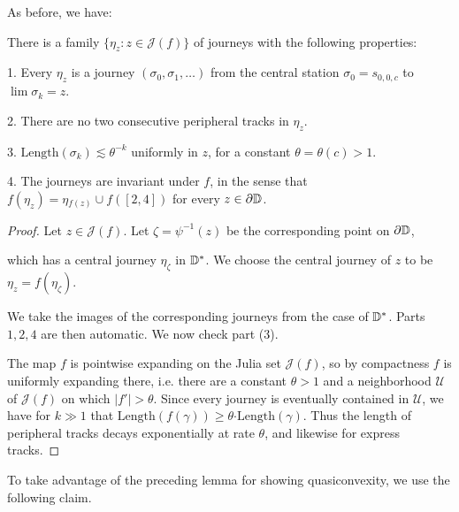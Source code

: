As before, we have:
\begin{lemma}
There is a family $\{\eta_{z}:z\in\mathcal{J}(f)\}$ of journeys
with the following properties:

1. Every $\eta_{z}$ is a journey $\left(\sigma_{0},\sigma_{1},\ldots\right)$
from the central station $\sigma_{0}=s_{0,0,c}$ to $\lim\sigma_{k}=z$.

2. There are no two consecutive peripheral tracks in $\eta_{z}$.

3. $\mathrm{Length}(\sigma_{k})\lesssim\theta^{-k}$ uniformly in
$z$, for a constant $\theta=\theta(c)>1$.

4. The journeys are invariant under $f$, in the sense that $f(\eta_{z})=\eta{}_{f(z)}\cup f\left([2,4]\right)$
for every $z\in\partial\mathbb{D}$.
\end{lemma}

\begin{proof}
Let $z\in\mathcal{J}\left(f\right)$. Let $\zeta=\psi^{-1}(z)$
be the corresponding point on $\partial\mathbb{D}$, %
\begin{comment}
because $\psi$ extends to a homeomorphism in the hyperbolic case.
\end{comment}

which has a central journey $\eta_{\zeta}$ in $\mathbb{D}^{*}$. We choose
the central journey of $z$ to be $\eta_{z}=f\left(\eta_{\zeta}\right).$

We take the images of the corresponding journeys from the case of
$\mathbb{D}^{*}$. Parts $1,2,4$ are then automatic. We now check part (3). 

The map $f$ is pointwise expanding on the Julia set $\mathcal{J}(f)$,
so by compactness $f$ is uniformly expanding there, i.e. there
are a constant $\theta>1$ and a neighborhood $\mathcal{U}$ of $\mathcal{J}(f)$
on which $\left|f'\right|>\theta$. Since every journey is eventually
contained in $\mathcal{U}$, we have for $k\gg1$ that $\mathrm{Length}(f(\gamma))\geq\theta\mathrm{\cdot Length}\left(\gamma\right)$.
Thus the length of peripheral tracks decays exponentially at rate
$\theta$, and likewise for express tracks.%
\begin{comment}
Let $z=z_{1}=\exp(2\pi i\theta)\in\partial\D$. We choose the stations
$\sigma_{i}$ inductively in pairs, in a greedy manner. In each step
we drive peripherally to the station closest to $z_{1}$ and then
drive to its radial successor. See Figure. 
\end{comment}
\end{proof}
%
To take advantage of the preceding lemma for showing quasiconvexity,
we use the following claim.


